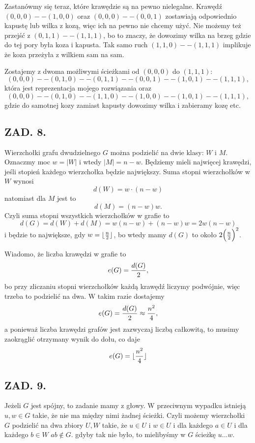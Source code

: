 \documentclass{article}
\begin{document}
    Zastanówmy się teraz, które krawędzie są na pewno nielegalne. Krawędź $(0,0,0)--(1,0,0)$ oraz $(0,0,0)--(0,0,1)$ zostawiają odpowiednio kapustę lub wilka z kozą, więc ich na pewno nie chcemy użyć. Nie możemy też przejść z $(0,1,1)--(1,1,1)$, bo to znaczy, że dowozimy wilka na brzeg gdzie do tej pory była koza i kapusta. Tak samo ruch $(1,1,0)--(1,1,1)$ implikuje że koza przeżyła z wilkiem sam na sam.

    Zostajemy z dwoma możliwymi ścieżkami od $(0,0,0)$ do $(1,1,1)$:
    $$(0,0,0)--(0,1,0)--(0,1,1)--(0,0,1)--(1,0,1)--(1,1,1),$$
    która jest reprezentacja mojego rozwiązania oraz
    $$(0,0,0)--(0,1,0)--(1,1,0)--(1,0,0)--(1,0,1)--(1,1,1),$$
    gdzie do samotnej kozy zamiast kapusty dowozimy wilka i zabieramy kozę etc.

    \subsection*{ZAD. 8.}

    Wierzchołki grafu dwudzielnego $G$ można podzielić na dwie klasy: $W$ i $M$. Oznaczmy moc $w=|W|$ i wtedy $|M|=n-w$. Będziemy mieli najwięcej krawędzi, jeśli stopień każdego wierzchołka będzie największy. Suma stopni wierzchołków w $W$ wynosi
    $$d(W)=w\cdot(n-w)$$
    natomiast dla $M$ jest to
    $$d(M)=(n-w)w.$$
    Czyli suma stopni wszystkich wierzchołków w grafie to
    $$d(G)=d(W)+d(M)=w(n-w)+(n-w)w=2w(n-w)$$
    i będzie to największe, gdy $w=\lfloor {n\over2}\rfloor$, bo wtedy mamy $d(G)$ to około $2\Big({n\over2}\Big)^2$.

    Wiadomo, że liczba krawędzi w grafie to
    $$e(G)={d(G)\over2},$$
    bo przy zliczaniu stopni wierzchołków każdą krawędź liczymy podwójnie, więc trzeba to podzielić na dwa. W takim razie dostajemy
    $$e(G)={d(G)\over 2}\approx{n^2\over4},$$
    a ponieważ liczba krawędzi grafów jest zazwyczaj liczbą całkowitą, to musimy zaokrąglić otrzymany wynik do dołu, co daje
    $$e(G)=\lfloor{n^2\over4}\rfloor$$
    
    \subsection*{ZAD. 9.}

    Jeżeli $G$ jest spójny, to zadanie mamy z głowy. W przeciwnym wypadku istnieją $u,w\in G$ takie, że nie ma między nimi żadnej ścieżki. Czyli możemy wierzchołki $G$ podzielić na dwa zbiory $U,W$ takie, że $u\in U$ i $w\in U$ i dla każdego $a\in U$ i dla każdego $b\in W$ $ab\notin G$. gdyby tak nie było, to mielibyśmy w $G$ ścieżkę $u...w$.
    
\end{document}
